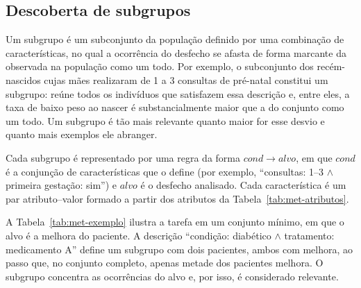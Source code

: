 \subsection{Descoberta de subgrupos}\label{subsec:met-ssdp}

Um subgrupo é um subconjunto da população definido por uma combinação de características, no qual a ocorrência do desfecho se afasta de forma marcante da observada na população como um todo. Por exemplo, o subconjunto dos recém-nascidos cujas mães realizaram de 1 a 3 consultas de pré-natal constitui um subgrupo: reúne todos os indivíduos que satisfazem essa descrição e, entre eles, a taxa de baixo peso ao nascer é substancialmente maior que a do conjunto como um todo. Um subgrupo é tão mais relevante quanto maior for esse desvio e quanto mais exemplos ele abranger.

Cada subgrupo é representado por uma regra da forma $\mathit{cond} \rightarrow \mathit{alvo}$, em que $\mathit{cond}$ é a conjunção de características que o define (por exemplo, ``consultas: 1--3 $\wedge$ primeira gestação: sim'') e $\mathit{alvo}$ é o desfecho analisado. Cada característica é um par atributo--valor formado a partir dos atributos da Tabela~\ref{tab:met-atributos}.

A Tabela~\ref{tab:met-exemplo} ilustra a tarefa em um conjunto mínimo, em que o alvo é a melhora do paciente. A descrição ``condição: diabético $\wedge$ tratamento: medicamento A'' define um subgrupo com dois pacientes, ambos com melhora, ao passo que, no conjunto completo, apenas metade dos pacientes melhora. O subgrupo concentra as ocorrências do alvo e, por isso, é considerado relevante.

